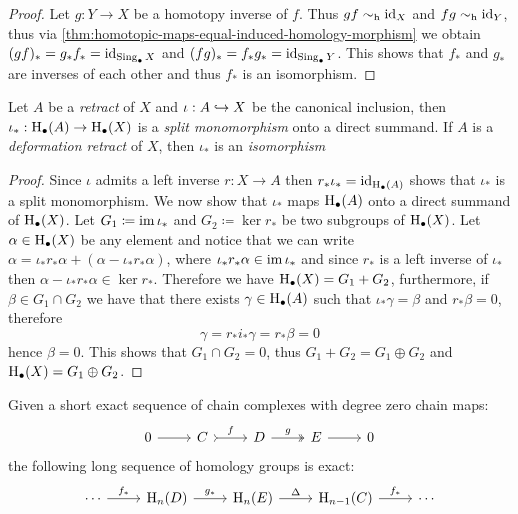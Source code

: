 \begin{proof}
Let \(g: Y \to X\) be a homotopy inverse of \(f\). Thus \(g f \sim_{\text{h}} \operatorname{id}_X\) and
\(f g \sim_{\text{h}} \operatorname{id}_Y\), thus via
\cref{thm:homotopic-maps-equal-induced-homology-morphism} we obtain \((g f)_{*}
= g_{*} f_{*} = \operatorname{id}_{\operatorname{Sing}_{\bullet} X}\) and \((f g)_{*} = f_{*} g_{*} =
\operatorname{id}_{\operatorname{Sing}_{\bullet} Y}\). This shows that \(f_{*}\) and \(g_{*}\) are inverses
of each other and thus \(f_{*}\) is an isomorphism.
\end{proof}

\begin{corollary}
\label{cor:retract-monic-homology}
Let \(A\) be a \emph{retract} of \(X\) and \(\iota: A \hookrightarrow X\) be the canonical
inclusion, then \(\iota_{*}: \operatorname{H}_{\bullet}(A) \to \operatorname{H}_{\bullet}(X)\) is a
\emph{split monomorphism} onto a direct summand. If \(A\) is a \emph{deformation
  retract} of \(X\), then \(\iota_{*}\) is an \emph{isomorphism}
\end{corollary}

\begin{proof}
Since \(\iota\) admits a left inverse \(r: X \to A\) then
\(r_{*} \iota_{*} = \operatorname{id}_{\operatorname{H}_{\bullet}(A)}\) shows that \(\iota_{*}\) is a
split monomorphism. We now show that \(\iota_{*}\) maps \(\operatorname{H}_{\bullet}(A)\)
onto a direct summand of \(\operatorname{H}_{\bullet}(X)\). Let
\(G_1 \coloneq \operatorname{im} \iota_{*}\) and \(G_2 \coloneq \ker r_{*}\) be two subgroups
of \(\operatorname{H}_{\bullet}(X)\). Let \(\alpha \in \operatorname{H}_{\bullet}(X)\) be any element
and notice that we can write
\(\alpha = \iota_{*} r_{*} \alpha + (\alpha - \iota_{*} r_{*} \alpha)\), where
\(\iota_{*} r_{*} \alpha \in \operatorname{im} \iota_{*}\) and since \(r_{*}\) is a left
inverse of \(\iota_{*}\) then
\(\alpha - \iota_{*} r_{*} \alpha \in \ker r_{*}\). Therefore we have
\(\operatorname{H}_{\bullet}(X) = G_1 + G_2\), furthermore, if \(\beta \in G_1 \cap G_2\)
we have that there exists \(\gamma \in \operatorname{H}_{\bullet}(A)\) such that
\(\iota_{*} \gamma = \beta\) and \(r_{*} \beta = 0\), therefore
\[
\gamma = r_{*} i_{*} \gamma = r_{*} \beta = 0
\]
hence \(\beta = 0\). This shows that \(G_1 \cap G_2 = 0\), thus
\(G_1 + G_2 = G_1 \oplus G_2\) and \(\operatorname{H}_{\bullet}(X) = G_1 \oplus G_2\).
\end{proof}

\begin{theorem}
\label{thm:long-exact-sequence}
Given a short exact sequence of chain complexes with degree zero chain maps:
\[
\begin{tikzcd}
0 \ar[r]
&C \ar[r, tail, "f"]
&D \ar[r, two heads, "g"]
&E \ar[r]
&0
\end{tikzcd}
\]
the following long sequence of homology groups is exact:
\[
\begin{tikzcd}
\cdots \ar[r, "f_{*}"]
&\Hmlg_n(D) \ar[r, "g_{*}"]
&\Hmlg_n(E) \ar[r, "\Delta"]
&\Hmlg_{n-1}(C) \ar[r, "f_{*}"]
&\cdots
\end{tikzcd}
\]
\end{theorem}









